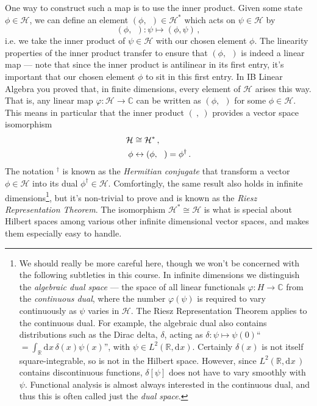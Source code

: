 \documentclass{article}
\theoremstyle{plain}\theoremheaderfont{\normalfont\itshape}\theorembodyfont{\rmfamily}\theoremseparator{.}\newtheorem*{rem}{Remark}\newtheorem*{ex}{Example}\newtheorem*{proof}{Proof}\newtheorem*{altp}{Alternative proof}
\theoremstyle{plain}\theoremheaderfont{\normalfont\bfseries}\theorembodyfont{\rmfamily}\theoremseparator{.}\newtheorem{thm}{Theorem}[section]\newtheorem{lem}[thm]{Lemma}\newtheorem{prop}[thm]{Proposition}\newtheorem*{cor}{Corollary}\newtheorem{defn}[thm]{Definition}\newtheorem{clm}[thm]{Claim}\newtheorem{clminproof}{Claim}
\theoremstyle{break}\theoremheaderfont{\normalfont\itshape}\theorembodyfont{\rmfamily}\theoremseparator{.\medskip}\newtheorem*{proofskip}{Proof}\newtheorem*{exs}{Examples}\newtheorem*{rems}{Remarks}
\theoremstyle{break}\theoremheaderfont{\normalfont\bfseries}\theorembodyfont{\rmfamily}\theoremseparator{.\medskip}\newtheorem{lemskip}[thm]{Lemma}\newtheorem{defnskip}[thm]{Definition}\newtheorem{propskip}[thm]{Proposition}\newtheorem{thmskip}[thm]{Theorem}
\numberwithin{equation}{section}
\newcommand{\dd}[2][]{\mathrm{d}^{#1} #2\,}
\renewcommand{\d}[2][]{\mathrm{d}^{#1} #2}
\newcommand{\vb}[1]{\bm{\mathrm{#1}}}
\newcommand{\hb}{\mathcal{H}}
\newcommand{\RR}{\mathbb{R}}
\newcommand{\CC}{\mathbb{C}}
\begin{document}
    One way to construct such a map is to use the inner product. Given some state \(\phi\in\hb\), we can define an element \((\phi,\ \ )\in\hb^*\) which acts on \(\psi\in\hb\) by
    \begin{equation}
        (\phi,\ \ ):\psi\longmapsto(\phi,\psi)\,,
    \end{equation}
    i.e. we take the inner product of \(\psi\in\hb\) with our chosen element \(\phi\). The linearity properties of the inner product transfer to ensure that \((\phi,\ \ )\) is indeed a linear map --- note that since the inner product is antilinear in its first entry, it's important that our chosen element \(\phi\) to sit in this first entry. In IB Linear Algebra you proved that, in finite dimensions, every element of \(\hb\) arises this way. That is, any linear map \(\varphi:\hb\to\CC\) can be written as \((\phi,\ \ )\) for some \(\phi\in\hb\). This means in particular that the inner product \((\ ,\ )\) provides a vector space isomorphism
    \begin{align}
        \hb&\cong\hb^*\,, \notag\\
        \phi&\leftrightarrow (\phi,\ \ )=\phi^\dagger\,.
    \end{align}
    The notation \(^\dagger\) is known as the \textit{Hermitian conjugate} that transform a vector \(\phi\in\hb\) into its dual \(\phi^\dagger\in\hb\). Comfortingly, the same result also holds in infinite dimensions\footnote{We should really be more careful here, though we won't be concerned with the following subtleties in this course. In infinite dimensions we distinguish the \textit{algebraic dual space} --- the space of all linear functionals \(\varphi:H\to\CC\) from the \textit{continuous dual}, where the number \(\varphi(\psi)\) is required to vary continuously as \(\psi\) varies in \(\hb\). The Riesz Representation Theorem applies to the continuous dual. For example, the algebraic dual also contains distributions such as the Dirac delta, \(\delta\), acting as \(\delta:\psi\mapsto\psi(\vb{0})\)``\(=\int_\RR\dd{x}\delta(x)\psi(x)\)'', with \(\psi\in L^2(\RR,\d{x})\). Certainly \(\delta(x)\) is not itself square-integrable, so is not in the Hilbert space. However, since \(L^2(\RR,\dd{x})\) contains discontinuous functions, \(\delta[\psi]\) does not have to vary smoothly with \(\psi\). Functional analysis is almost always interested in the continuous dual, and thus this is often called just the \textit{dual space}.}, but it's non-trivial to prove and is known as the \textit{Riesz Representation Theorem}. The isomorphism \(\hb^*\cong\hb\) is what is special about Hilbert spaces among various other infinite dimensional vector spaces, and makes them especially easy to handle.
\end{document}
